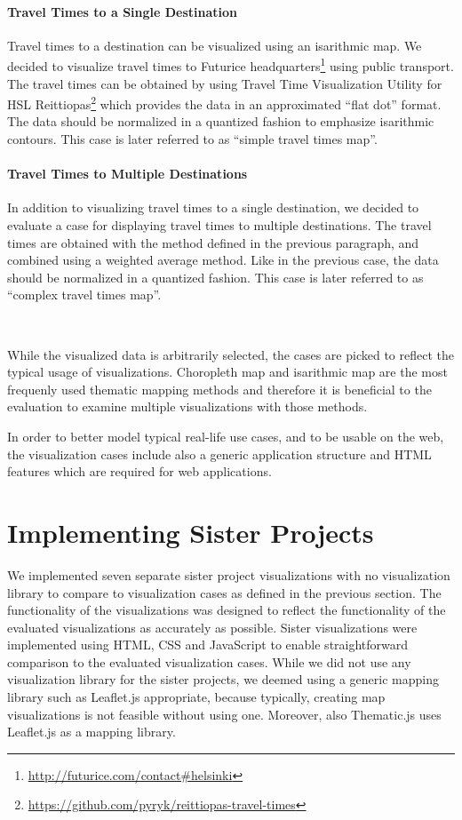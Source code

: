 \paragraph{Travel Times to a Single Destination}
Travel times to a destination can be visualized using an isarithmic map. We decided to visualize travel times to Futurice headquarters\footnote{\url{http://futurice.com/contact\#helsinki}} using public transport. The travel times can be obtained by using Travel Time Visualization Utility for HSL Reittiopas\footnote{\url{https://github.com/pyryk/reittiopas-travel-times}} which provides the data in an approximated ``flat dot'' format. The data should be normalized in a quantized fashion to emphasize isarithmic contours. This case is later referred to as ``simple travel times map''.

\paragraph{Travel Times to Multiple Destinations}
In addition to visualizing travel times to a single destination, we decided to evaluate a case for displaying travel times to multiple destinations. The travel times are obtained with the method defined in the previous paragraph, and combined using a weighted average method. Like in the previous case, the data should be normalized in a quantized fashion. This case is later referred to as ``complex travel times map''.


~

While the visualized data is arbitrarily selected, the cases are picked to reflect the typical usage of visualizations. Choropleth map and isarithmic map are the most frequenly used thematic mapping methods \citep[chap.~14-15]{slocum_thematic_2014} and therefore it is beneficial to the evaluation to examine multiple visualizations with those methods.

In order to better model typical real-life use cases, and to be usable on the web, the visualization cases include also a generic application structure and HTML features  which are required for web applications.

\section{Implementing Sister Projects}

We implemented seven separate sister project visualizations with no visualization library to compare to visualization cases as defined in the previous section. The functionality of the visualizations was designed to reflect the functionality of the evaluated visualizations as accurately as possible. Sister visualizations were implemented using HTML, CSS and JavaScript to enable straightforward comparison to the evaluated visualization cases. While we did not use any visualization library for the sister projects, we deemed using a generic mapping library such as Leaflet.js appropriate, because typically, creating map visualizations is not feasible without using one. Moreover, also Thematic.js uses Leaflet.js as a mapping library.

